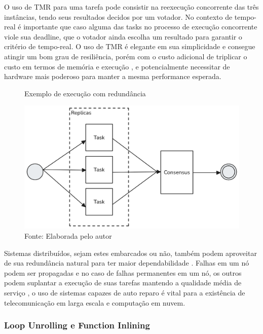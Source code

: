 O uso de TMR para uma tarefa pode consistir na reexecução concorrente das três instâncias, tendo seus resultados decidos por um votador. No contexto de tempo-real é importante que caso alguma das tasks no processo de execução concorrente viole sua deadline, que o votador ainda escolha um resultado para garantir o critério de tempo-real. O uso de TMR é elegante em sua simplicidade e consegue atingir um bom grau de resiliência, porém com o custo adicional de triplicar o custo em termos de memória e execução \cite{DependabilityInEmbeddedSystems}, e potencialmente necessitar de hardware mais poderoso para manter a mesma performance esperada.

\begin{figure}[H]
    \centering
    \captionsetup{justification=centering}
    \caption{Exemplo de execução com redundância}
    \includegraphics[width=1.0\textwidth]{assets/redundancia_tmr.png}
    \captionsetup{justification=raggedright}
    \caption*{Fonte: Elaborada pelo autor}
    \label{fig:redundanciaTMR}
\end{figure}

Sistemas distribuídos, sejam estes embarcados ou não, também podem aproveitar de sua redundância natural para ter maior dependabilidade \cite{MakingReliableDistSystems}. Falhas em um nó podem ser propagadas e no caso de falhas permanentes em um nó, os outros podem suplantar a execução de suas tarefas mantendo a qualidade média de serviço \cite{MakingReliableDistSystems} \cite{SchedAndOptOfDistributedFT}, o uso de sistemas capazes de auto reparo é vital para a existência de telecomunicação em larga escala e computação em nuvem.

\subsubsection{Loop Unrolling e Function Inlining}

